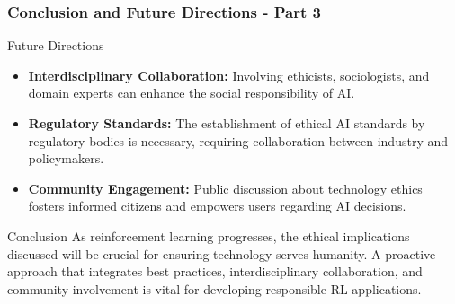 \documentclass[aspectratio=169]{beamer}
\begin{document}
\begin{frame}[fragile]
    \frametitle{Conclusion and Future Directions - Part 3}
    \begin{block}{Future Directions}
        \begin{itemize}
            \item \textbf{Interdisciplinary Collaboration:} Involving ethicists, sociologists, and domain experts can enhance the social responsibility of AI.
            \item \textbf{Regulatory Standards:} The establishment of ethical AI standards by regulatory bodies is necessary, requiring collaboration between industry and policymakers.
            \item \textbf{Community Engagement:} Public discussion about technology ethics fosters informed citizens and empowers users regarding AI decisions.
        \end{itemize}
    \end{block}
    
    \begin{block}{Conclusion}
        As reinforcement learning progresses, the ethical implications discussed will be crucial for ensuring technology serves humanity. A proactive approach that integrates best practices, interdisciplinary collaboration, and community involvement is vital for developing responsible RL applications.
    \end{block}
\end{frame}
\end{document}
